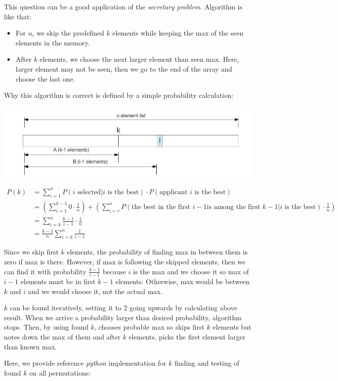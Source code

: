 This question can be a good application of the \textit{secretary problem}. Algorithm is like that:

\begin{itemize}
  \item For $n$, we skip the predefined $k$ elements while keeping the max of the seen elements in the memory.
  \item After $k$ elements, we choose the next larger element than seen max. Here, larger element may not be seen, then we go to the end of the array and choose the last one.
\end{itemize}

Why this algorithm is correct is defined by a simple probability calculation:

\includegraphics[scale=0.5]{q4}

\begin{equation*}
  \begin{split}
  P(k) &= \sum_{i=1}^{n} P(\text{$i$ selected} | \text{$i$ is the best}) \cdot P(\text{applicant $i$ is the best}) \\
       &= (\sum_{i=1}^{k-1} 0 \cdot \frac{1}{n}) + (\sum_{i=r}^{n} P(
         \text{the best in the first $i-1$} 
         \text{is among the first $k-1$} | \text{$i$ is the best}) \cdot \frac{1}{n}) \\
       &= \sum_{i=k}^{n} \frac{k-1}{i-1} \cdot \frac{1}{n} \\
       &= \frac{k-1}{n} \sum_{i=k}^{n} \frac{1}{i-1} 
  \end{split} 
\end{equation*}

  Since we skip first $k$ elements, the probability of finding max in between them is zero if max is there. However, if max is following the skipped elements, then we can find it with probability $\frac{k-1}{i-1}$ because $i$ is the max and we choose it so max of $i-1$ elements must be in first $k-1$ elements. Otherwise, max would be between $k$ and $i$ and we would choose it, not the actual max.
  
  $k$ can be found iteratively, setting it to 2 going upwards by calculating above result. When we arrive a probability larger than desired probability, algorithm stops. Then, by using found $k$, chooses probable max so skips first $k$ elements but notes down the max of them and after $k$ elements, picks the first element larger than known max.
  
  Here, we provide reference \textit{python} implementation for $k$ finding and testing of found $k$ on all permutations:


